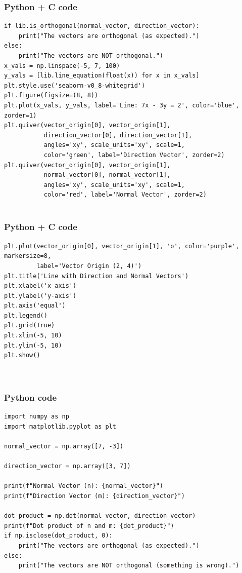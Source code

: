 \documentclass{beamer}
\begin{document}
\begin{frame}[fragile]
    \frametitle{Python + C code}

    \begin{lstlisting}
if lib.is_orthogonal(normal_vector, direction_vector):
    print("The vectors are orthogonal (as expected).")
else:
    print("The vectors are NOT orthogonal.")
x_vals = np.linspace(-5, 7, 100)
y_vals = [lib.line_equation(float(x)) for x in x_vals]
plt.style.use('seaborn-v0_8-whitegrid')
plt.figure(figsize=(8, 8))
plt.plot(x_vals, y_vals, label='Line: 7x - 3y = 2', color='blue', zorder=1)
plt.quiver(vector_origin[0], vector_origin[1],
           direction_vector[0], direction_vector[1],
           angles='xy', scale_units='xy', scale=1,
           color='green', label='Direction Vector', zorder=2)
plt.quiver(vector_origin[0], vector_origin[1],
           normal_vector[0], normal_vector[1],
           angles='xy', scale_units='xy', scale=1,
           color='red', label='Normal Vector', zorder=2)


    \end{lstlisting}
\end{frame}

\begin{frame}[fragile]
    \frametitle{Python + C code}

    \begin{lstlisting}
plt.plot(vector_origin[0], vector_origin[1], 'o', color='purple', markersize=8,
         label='Vector Origin (2, 4)')
plt.title('Line with Direction and Normal Vectors')
plt.xlabel('x-axis')
plt.ylabel('y-axis')
plt.axis('equal')
plt.legend()
plt.grid(True)
plt.xlim(-5, 10)
plt.ylim(-5, 10)
plt.show()



    \end{lstlisting}
\end{frame}

\begin{frame}[fragile]
    \frametitle{Python code}

    \begin{lstlisting}
import numpy as np
import matplotlib.pyplot as plt

normal_vector = np.array([7, -3])

direction_vector = np.array([3, 7])

print(f"Normal Vector (n): {normal_vector}")
print(f"Direction Vector (m): {direction_vector}")

dot_product = np.dot(normal_vector, direction_vector)
print(f"Dot product of n and m: {dot_product}")
if np.isclose(dot_product, 0):
    print("The vectors are orthogonal (as expected).")
else:
    print("The vectors are NOT orthogonal (something is wrong).")

    \end{lstlisting}
\end{frame}
\end{document}
